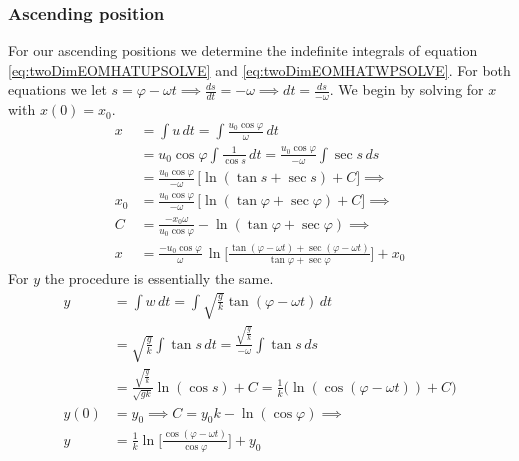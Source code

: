 \documentclass[%
aip,
jmp,
amsmath,amssymb,
reprint,%
]{revtex4-1}
\begin{document}
	\subsubsection{Ascending position}
	For our ascending positions we determine the indefinite integrals of equation \eqref{eq:twoDimEOMHATUPSOLVE} and \eqref{eq:twoDimEOMHATWPSOLVE}. For both equations we let $s = \varphi - \omega t \implies \frac{ds}{dt} = -\omega \implies dt = \frac{ds}{-\omega}$. We begin by solving for $x$ with $x(0) = x_0$.
	\begin{align}\nonumber
		x &= \int u\,dt = \int \frac{u_0\cos\varphi}{\omega}\,dt\\\nonumber
		&= u_0\cos\varphi\int \frac{1}{\cos s}\,dt = \frac{u_0\cos\varphi}{-\omega}\int \sec s\,ds\\\nonumber
		&= \frac{u_0\cos\varphi}{-\omega}\,\Big\lbrack\ln(\tan s+\sec s) + C\Big\rbrack \implies\\\nonumber
		x_0 &= \frac{u_0\cos\varphi}{-\omega}\,\Big\lbrack\ln(\tan\varphi+\sec\varphi) + C\Big\rbrack \implies\\\nonumber
		C &= \frac{-x_0\omega}{u_0\cos\varphi}-\ln(\tan\varphi+\sec\varphi) \implies\\\label{eq:twoDimHATXFIN}
		x &= \frac{-u_0\cos\varphi}{\omega}\,\ln\Bigg\lbrack\frac{\tan(\varphi-\omega t)+\sec(\varphi-\omega t)}{\tan\varphi+\sec\varphi}\Bigg\rbrack +x_0
	\end{align}
	For $y$ the procedure is essentially the same.
	\begin{align}\nonumber
		y &= \int w \,dt = \int \sqrt{\frac{g}{k}} \tan(\varphi - \omega t)\,dt\\\nonumber
		&= \sqrt{\frac{g}{k}} \int \tan s \,dt = \frac{\sqrt{\frac{g}{k}}}{-\omega} \int \tan s\,ds\\\nonumber
		&=\frac{\sqrt{\frac{g}{k}}}{\sqrt{gk}} \ln(\cos s) + C = \frac{1}{k}\big(\ln(\cos(\varphi - \omega t)) + C\big)\\\nonumber
		y(0) &= y_0 \implies C = y_0k-\ln(\cos\varphi) \implies\\\label{eq:twoDimHATYFIN}
		y &= \frac{1}{k}\ln\Bigg\lbrack\frac{\cos(\varphi-\omega t)}{\cos\varphi}\Bigg\rbrack+y_0
	\end{align}
\end{document}
